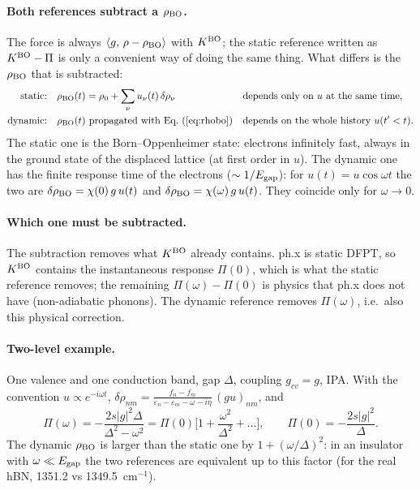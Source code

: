 \documentclass[11pt]{article}
\newcommand{\KBO}{K^{\rm BO}}
\newcommand{\rBO}{\rho_{\rm BO}}
\newcommand{\inner}[2]{\langle #1,\,#2\rangle}
\begin{document}
\paragraph{Both references subtract a $\rho_{\rm BO}$.} The force is always $\inner{g}{\rho-\rBO}$ with $\KBO$; the
static reference written as $\KBO-\Pi$ is only a convenient way of doing the same thing. What differs is the
$\rBO$ that is subtracted:
\begin{align}
\text{static:}\quad  & \rBO(t) = \rho_0 + \sum_\nu u_\nu(t)\,\delta\rho_\nu
  && \text{depends only on } u \text{ at the same time,}\\
\text{dynamic:}\quad & \rBO(t) \text{ propagated with Eq.~(\ref{eq:rhobo})}
  && \text{depends on the whole history } u(t'<t).
\end{align}
The static one is the Born--Oppenheimer state: electrons infinitely fast, always in the ground state of the displaced
lattice (at first order in $u$). The dynamic one has the finite response time of the electrons ($\sim 1/E_{\rm gap}$):
for $u(t)=u\cos\omega t$ the two are $\delta\rBO = \chi(0)\,g\,u(t)$ and $\delta\rBO = \chi(\omega)\,g\,u(t)$. They
coincide only for $\omega\to 0$.

\paragraph{Which one must be subtracted.} The subtraction removes what $\KBO$ already contains. ph.x is static DFPT,
so $\KBO$ contains the instantaneous response $\Pi(0)$, which is what the static reference removes; the remaining
$\Pi(\omega)-\Pi(0)$ is physics that ph.x does not have (non-adiabatic phonons). The dynamic reference removes
$\Pi(\omega)$, i.e.\ also this physical correction.

\paragraph{Two-level example.} One valence and one conduction band, gap $\Delta$, coupling $g_{cv}=g$, IPA. With the
convention $u\propto e^{-i\omega t}$, $\delta\rho_{nm} = \frac{f_n-f_m}{\varepsilon_n-\varepsilon_m-\omega-i\eta}\,(g u)_{nm}$, and
\begin{equation}
\Pi(\omega) = -\frac{2s|g|^2\Delta}{\Delta^2-\omega^2}
            = \Pi(0)\Big[1+\frac{\omega^2}{\Delta^2}+\dots\Big], \qquad \Pi(0) = -\frac{2s|g|^2}{\Delta}.
\end{equation}
The dynamic $\rBO$ is larger than the static one by $1+(\omega/\Delta)^2$: in an insulator with $\omega\ll E_{\rm gap}$
the two references are equivalent up to this factor (for the real hBN, 1351.2 vs 1349.5~cm$^{-1}$).
\end{document}
